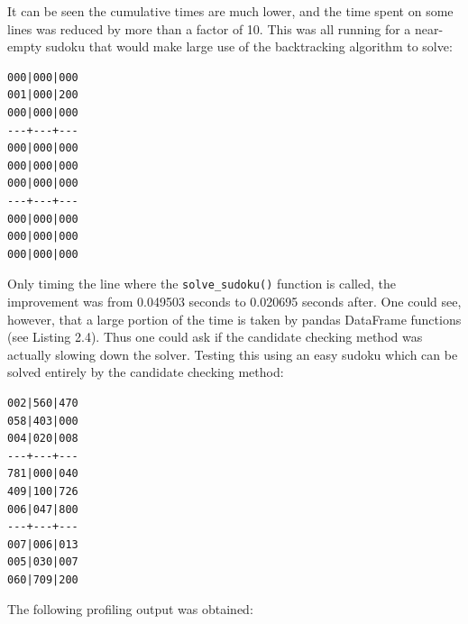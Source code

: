 \documentclass[12pt]{report} %
\begin{document}
It can be seen the cumulative times are much lower, and the time spent on some lines was reduced by more than a factor of 10. This was all running for a near-empty sudoku that would make large use of the backtracking algorithm to solve:

\begin{lstlisting}[caption = {sudoku\_near\_empty.txt}]
000|000|000
001|000|200
000|000|000
---+---+---
000|000|000
000|000|000
000|000|000
---+---+---
000|000|000
000|000|000
000|000|000
\end{lstlisting}

Only timing the line where the \texttt{solve\_sudoku()} function is called, the improvement was from 0.049503 seconds to 0.020695 seconds after. One could see, however, that a large portion of the time is taken by pandas DataFrame functions (see Listing 2.4). Thus one could ask if the candidate checking method was actually slowing down the solver. Testing this using an easy sudoku which can be solved entirely by the candidate checking method:

\begin{lstlisting}[caption= {sudoku\_easy.txt}]
002|560|470
058|403|000
004|020|008
---+---+---
781|000|040
409|100|726
006|047|800
---+---+---
007|006|013
005|030|007
060|709|200
\end{lstlisting}
\newpage
The following profiling output was obtained:
\end{document}
